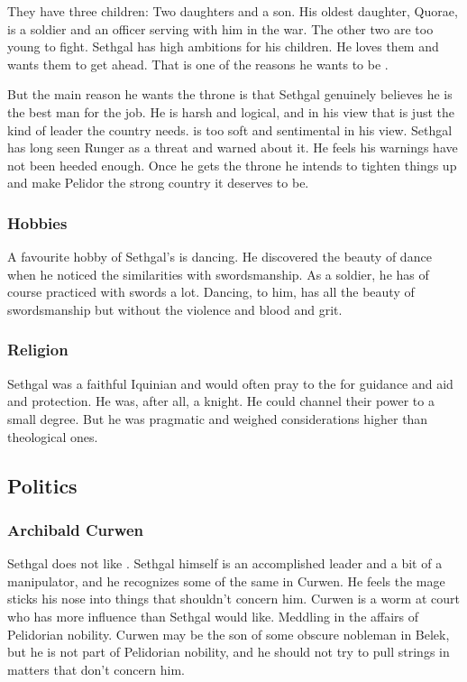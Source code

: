 They have three children: 
Two daughters and a son. 
His oldest daughter, Quorae, is a soldier and an officer serving with him in the war. 
The other two are too young to fight. 
Sethgal has high ambitions for his children. 
He loves them and wants them to get ahead. 
That is one of the reasons he wants to be \rayuth. 

But the main reason he wants the throne is that Sethgal genuinely believes he is the best man for the job. 
He is harsh and logical, and in his view that is just the kind of leader the country needs. 
\Icor{} is too soft and sentimental in his view. 
Sethgal has long seen Runger as a threat and warned about it. 
He feels his warnings have not been heeded enough. 
Once he gets the throne he intends to tighten things up and make Pelidor the strong country it deserves to be. 





\subsubsection{Hobbies}
A favourite hobby of Sethgal's is dancing. 
He discovered the beauty of dance when he noticed the similarities with swordsmanship. 
As a soldier, he has of course practiced with swords a lot. 
Dancing, to him, has all the beauty of swordsmanship but without the violence and blood and grit. 





\subsubsection{Religion}
Sethgal was a faithful Iquinian and would often pray to the \sephiroth for guidance and aid and protection.
He was, after all, a knight. 
He could channel their power to a small degree. 
But he was pragmatic and weighed  considerations higher than theological ones. 









\subsection{Politics}
\subsubsection{Archibald Curwen}
Sethgal does not like . 
Sethgal himself is an accomplished leader and a bit of a manipulator, and he recognizes some of the same in Curwen. 
He feels the mage sticks his nose into things that shouldn't concern him. 
Curwen is a worm at court who has more influence than Sethgal would like. 
Meddling in the affairs of Pelidorian nobility. 
Curwen may be the son of some obscure nobleman in Belek, but he is not part of Pelidorian nobility, and he should not try to pull strings in matters that don't concern him. 

